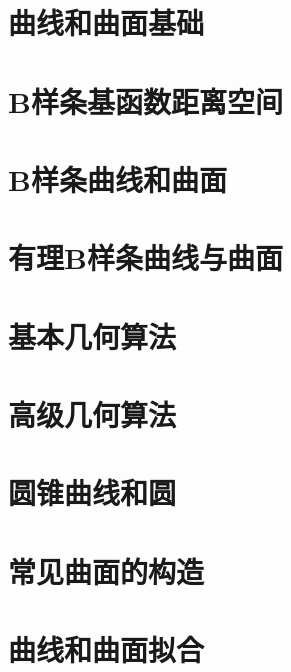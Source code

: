 \documentclass[zihao=false,linespread=1.5,heading=true,oneside,fontset=windows]{ctexbook}
\begin{document}
\thispagestyle{empty}%


\setcounter{page}{1}%

\newpage


\newpage

\tableofcontents
\newpage



\chapter{曲线和曲面基础}\label{sec:1}


\chapter{B样条基函数距离空间}\label{sec:2}


\chapter{B样条曲线和曲面}\label{sec:3}


\chapter{有理B样条曲线与曲面}\label{sec:4}


\chapter{基本几何算法}\label{sec:5}


\chapter{高级几何算法}\label{sec:6}


\chapter{圆锥曲线和圆}\label{sec:7}


\chapter{常见曲面的构造}\label{sec:8}


\chapter{曲线和曲面拟合}\label{sec:9}

\end{document}
